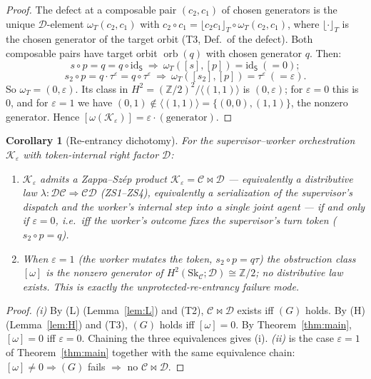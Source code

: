 \documentclass[11pt]{article}
\newtheorem{corollary}[theorem]{Corollary}
\theoremstyle{definition}
\newcommand{\id}{\mathrm{id}}
\newcommand{\C}{\mathcal{C}}
\newcommand{\D}{\mathcal{D}}
\newcommand{\K}{\mathcal{K}}
\newcommand{\Sk}{\mathrm{Sk}}
\newcommand{\orb}{\operatorname{orb}}
\newcommand{\flr}[1]{\lfloor #1 \rfloor}
\newcommand{\Sup}{\mathsf{S}}
\begin{document}
\begin{proof}
The defect at a composable pair $(c_2,c_1)$ of chosen generators is the unique
$\D$-element $\omega_T(c_2,c_1)$ with $c_2\circ c_1=\flr{c_2c_1}_T\circ
\omega_T(c_2,c_1)$, where $\flr{\cdot}_T$ is the chosen generator of the target
orbit (T3, Def.\ of the defect). Both composable pairs have target orbit
$\orb(q)$ with chosen generator $q$. Then:
\[
   s\circ p=q=q\circ\id_\Sup\ \Rightarrow\ \omega_T([s],[p])=\id_\Sup\ (=0);
\]
\[
   s_2\circ p=q\cdot\tau^\varepsilon=q\circ\tau^\varepsilon\ \Rightarrow\
   \omega_T([s_2],[p])=\tau^\varepsilon\ (=\varepsilon).
\]
So $\omega_T=(0,\varepsilon)$. Its class in $H^2=(\mathbb Z/2)^2/\langle(1,1)\rangle$
is $(0,\varepsilon)$; for $\varepsilon=0$ this is $0$, and for $\varepsilon=1$ we
have $(0,1)\notin\langle(1,1)\rangle=\{(0,0),(1,1)\}$, the nonzero generator. Hence
$[\omega(\K_\varepsilon)]=\varepsilon\cdot(\text{generator})$.
\end{proof}

\begin{corollary}[Re-entrancy dichotomy]\label{cor:main}
For the supervisor--worker orchestration $\K_\varepsilon$ with token-internal right
factor $\D$:
\begin{enumerate}
\item[(i)] $\K_\varepsilon$ admits a Zappa--Sz\'ep product $\K_\varepsilon=\C\bowtie\D$
--- equivalently a distributive law $\lambda:\D\C\Rightarrow\C\D$ (ZS1--ZS4),
equivalently a serialization of the supervisor's dispatch and the worker's internal
step into a single joint agent --- \emph{if and only if $\varepsilon=0$, i.e.\ iff
the worker's outcome fixes the supervisor's turn token} ($s_2\circ p=q$).
\item[(ii)] When $\varepsilon=1$ (the worker mutates the token, $s_2\circ p=q\tau$)
the obstruction class $[\omega]$ is the nonzero generator of
$H^2(\Sk_\C;\D)\cong\mathbb Z/2$; no distributive law exists. This is exactly the
unprotected-re-entrancy failure mode.
\end{enumerate}
\end{corollary}

\begin{proof}
\emph{(i)} By (L) (Lemma~\ref{lem:L}) and (T2), $\C\bowtie\D$ exists iff $(G)$ holds.
By (H) (Lemma~\ref{lem:H}) and (T3), $(G)$ holds iff $[\omega]=0$. By
Theorem~\ref{thm:main}, $[\omega]=0$ iff $\varepsilon=0$. Chaining the three
equivalences gives (i). \emph{(ii)} is the case $\varepsilon=1$ of
Theorem~\ref{thm:main} together with the same equivalence chain: $[\omega]\neq0
\Rightarrow(G)$ fails $\Rightarrow$ no $\C\bowtie\D$.
\end{proof}
\end{document}
